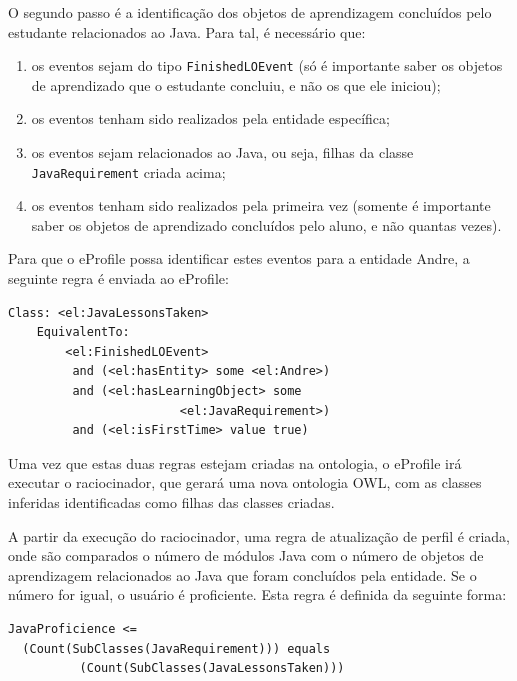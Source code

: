 \documentclass[times, 10pt, twocolumn]{article}
\begin{document}
O segundo passo é a identificação dos objetos de aprendizagem concluídos pelo estudante relacionados ao Java. Para tal, é necessário que:

\begin{enumerate} 
  \item os eventos sejam do tipo {\tt FinishedLOEvent} (só é importante saber os objetos de aprendizado que o estudante concluiu, e não os que ele iniciou);
  \item os eventos tenham sido realizados pela entidade específica;
  \item os eventos sejam relacionados ao Java, ou seja, filhas da classe {\tt JavaRequirement} criada acima;
  \item os eventos tenham sido realizados pela primeira vez (somente é importante saber os objetos de aprendizado concluídos pelo aluno, e não quantas vezes).
\end{enumerate}

Para que o eProfile possa identificar estes eventos para a entidade Andre, a seguinte regra é enviada ao eProfile:

\begin{code}
\begin{lstlisting}
Class: <el:JavaLessonsTaken>
    EquivalentTo: 
        <el:FinishedLOEvent>
         and (<el:hasEntity> some <el:Andre>)
         and (<el:hasLearningObject> some 
	                    <el:JavaRequirement>)
         and (<el:isFirstTime> value true)
\end{lstlisting}
\end{code}

Uma vez que estas duas regras estejam criadas na ontologia, o eProfile irá executar o raciocinador, que gerará uma nova ontologia OWL, com as classes inferidas identificadas como filhas das classes criadas.

A partir da execução do raciocinador, uma regra de atualização de perfil é criada, onde são comparados o número de módulos Java com o número de objetos de aprendizagem relacionados ao Java que foram concluídos pela entidade. Se o número for igual, o usuário é proficiente. Esta regra é definida da seguinte forma:

\begin{code}
\begin{lstlisting}
JavaProficience <= 
  (Count(SubClasses(JavaRequirement))) equals
          (Count(SubClasses(JavaLessonsTaken)))
\end{lstlisting}
\end{code}
\end{document}
